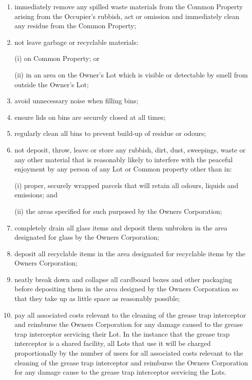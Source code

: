 \documentclass{article}
\begin{document}
\begin{enumerate}[label=\arabic*.]
\begin{enumerate}[label=\arabic{enumi}.\arabic*.]
\begin{enumerate}[label=(\arabic*)]
\begin{enumerate}[label=(\alph*)]
\item  immediately remove any spilled waste materials from the Common Property arising from the Occupier’s rubbish, act or omission and immediately clean any residue from the Common Property;

\item  not leave garbage or recyclable materials:

(i) on Common Property; or

(ii) in an area on the Owner’s Lot which is visible or detectable by smell from outside the Owner’s Lot;

\item  avoid unnecessary noise when filling bins;

\item  ensure lids on bins are securely closed at all times;

\item  regularly clean all bins to prevent build-up of residue or odours;

\item  not deposit, throw, leave or store any rubbish, dirt, dust, sweepings, waste or any other material that is reasonably likely to interfere with the peaceful enjoyment by any person of any Lot or Common property other than in:

(i) proper, securely wrapped parcels that will retain all odours, liquids and emissions; and
\newpage



(ii) the areas specified for such purposed by the Owners Corporation;

\item  completely drain all glass items and deposit them unbroken in the area designated for glass by the Owners Corporation;

\item  deposit all recyclable items in the area designated for recyclable items by the Owners Corporation;

\item  neatly break down and collapse all cardboard boxes and other packaging before depositing them in the area designed by the Owners Corporation so that they take up as little space as reasonably possible;

\item  pay all associated costs relevant to the cleaning of the grease trap interceptor and reimburse the Owners Corporation for any damage caused to the grease trap interceptor servicing their Lot. In the instance that the grease trap interceptor is a shared facility, all Lots that use it will be charged proportionally by the number of users for all associated costs relevant to the cleaning of the grease trap interceptor and reimburse the Owners Corporation for any damage cause to the grease trap interceptor servicing the Lots.


\end{enumerate}
\end{enumerate}
\end{enumerate}
\end{enumerate}
\end{document}
